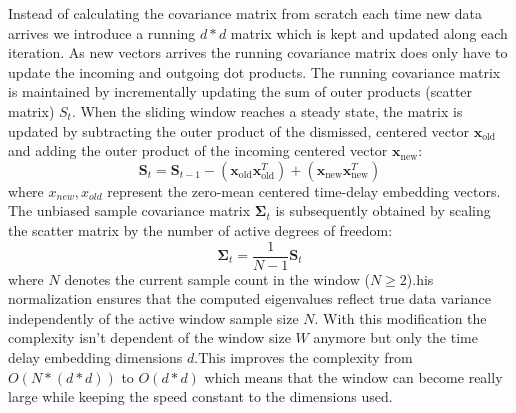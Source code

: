 Instead of calculating the covariance matrix from scratch each time new data arrives we introduce a running $d*d$ matrix which is kept and updated along each iteration. As new vectors arrives the running covariance matrix does only have to update the incoming and outgoing dot products. 
The running covariance matrix is maintained by incrementally updating the sum of outer products (scatter matrix) $S_t$. When the sliding window reaches a steady state, the matrix is updated by subtracting the outer product of the dismissed, centered vector $\mathbf{x}_{\text{old}}$ and adding the outer product of the incoming centered vector $\mathbf{x}_{\text{new}}$:
\begin{equation}
    \mathbf{S}_t = \mathbf{S}_{t-1} - \left( \mathbf{x}_{\text{old}} \mathbf{x}_{\text{old}}^T \right) + \left( \mathbf{x}_{\text{new}} \mathbf{x}_{\text{new}}^T \right)
    \label{eq:running_covariance_update}
\end{equation}
where $x_{new}, x_{old}$ represent the zero-mean centered time-delay embedding vectors. 
The unbiased sample covariance matrix $\mathbf{\Sigma}_t$ is subsequently obtained by scaling the scatter matrix by the number of active degrees of freedom:
\begin{equation}
    \mathbf{\Sigma}_t = \frac{1}{N - 1} \mathbf{S}_t
    \label{eq:covariance_scaling}
\end{equation}
where $N$ denotes the current sample count in the window ($N \ge 2$).his normalization ensures that the computed eigenvalues reflect true data variance independently of the active window sample size $N$.
With this modification the complexity isn't dependent of the window size $W$ anymore but only the time delay embedding dimensions $d$.This improves the complexity from $O(N*(d*d))$ to $O(d*d)$ which means that the window can become really large while keeping the speed constant to the dimensions used. 
